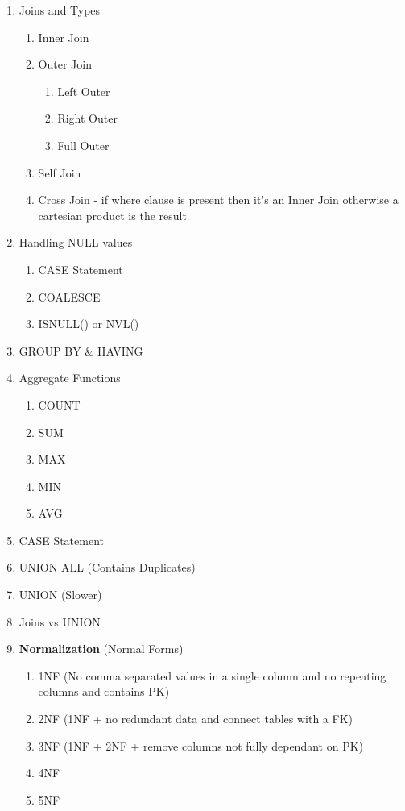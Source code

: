 \documentclass[11pt]{article}
\begin{document}
\begin{enumerate}
   \item Joins and Types
   \begin{enumerate}
   	\item Inner Join
   	\item Outer Join
   	\begin{enumerate}
   		\item Left Outer
   		\item Right Outer
   		\item Full Outer 
   	\end{enumerate}
   \item Self Join
   \item Cross Join - if where clause is present then it's an Inner Join otherwise a cartesian product is the result
   \end{enumerate}
    \item Handling NULL values
    \begin{enumerate}
    	\item CASE Statement
    	\item COALESCE
    	\item ISNULL() or NVL()
    \end{enumerate}
    \item GROUP BY \& HAVING
    \item Aggregate Functions
    \begin{enumerate}
    	\item COUNT
    	\item SUM
    	\item MAX
    	\item MIN
    	\item AVG
    \end{enumerate}
   \item CASE Statement
    \item UNION ALL (Contains Duplicates)
    \item UNION (Slower)
    \item Joins vs UNION
	\item \textbf{Normalization} (Normal Forms)
	\begin{enumerate}
		\item 1NF (No comma separated values in a single column and no repeating columns and contains PK)
		\item 2NF (1NF + no redundant data and connect tables with a FK)
		\item 3NF (1NF + 2NF + remove columns not fully dependant on PK)
		\item 4NF
		\item 5NF

\end{enumerate}
\end{enumerate}
\end{document}
